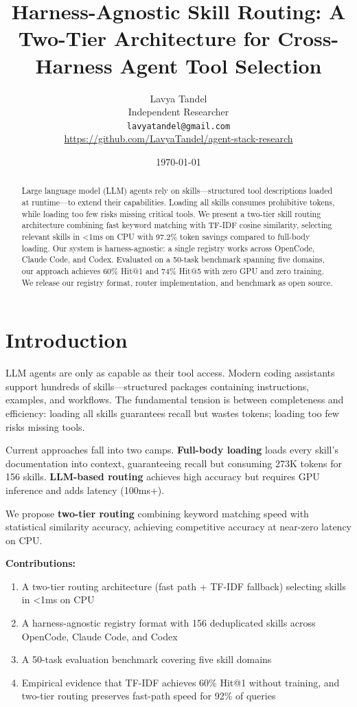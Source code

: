 \documentclass[11pt]{article}
\title{Harness-Agnostic Skill Routing: A Two-Tier Architecture for Cross-Harness Agent Tool Selection}
\author{
  Lavya Tandel\\
  Independent Researcher\\
  \texttt{lavyatandel@gmail.com}\\
  \url{https://github.com/LavyaTandel/agent-stack-research}
}
\date{\today}
\begin{document}
\maketitle

\begin{abstract}
Large language model (LLM) agents rely on skills---structured tool descriptions loaded at runtime---to extend their capabilities. Loading all skills consumes prohibitive tokens, while loading too few risks missing critical tools. We present a two-tier skill routing architecture combining fast keyword matching with TF-IDF cosine similarity, selecting relevant skills in <1ms on CPU with 97.2\% token savings compared to full-body loading. Our system is harness-agnostic: a single registry works across OpenCode, Claude Code, and Codex. Evaluated on a 50-task benchmark spanning five domains, our approach achieves 60\% Hit@1 and 74\% Hit@5 with zero GPU and zero training. We release our registry format, router implementation, and benchmark as open source.
\end{abstract}

\section{Introduction}

LLM agents are only as capable as their tool access. Modern coding assistants support hundreds of skills---structured packages containing instructions, examples, and workflows. The fundamental tension is between completeness and efficiency: loading all skills guarantees recall but wastes tokens; loading too few risks missing tools.

Current approaches fall into two camps. \textbf{Full-body loading} loads every skill's documentation into context, guaranteeing recall but consuming 273K tokens for 156 skills. \textbf{LLM-based routing} achieves high accuracy but requires GPU inference and adds latency (100ms+).

We propose \textbf{two-tier routing} combining keyword matching speed with statistical similarity accuracy, achieving competitive accuracy at near-zero latency on CPU.

\textbf{Contributions:}
\begin{enumerate}
  \item A two-tier routing architecture (fast path + TF-IDF fallback) selecting skills in <1ms on CPU
  \item A harness-agnostic registry format with 156 deduplicated skills across OpenCode, Claude Code, and Codex
  \item A 50-task evaluation benchmark covering five skill domains
  \item Empirical evidence that TF-IDF achieves 60\% Hit@1 without training, and two-tier routing preserves fast-path speed for 92\% of queries
\end{enumerate}
\end{document}
